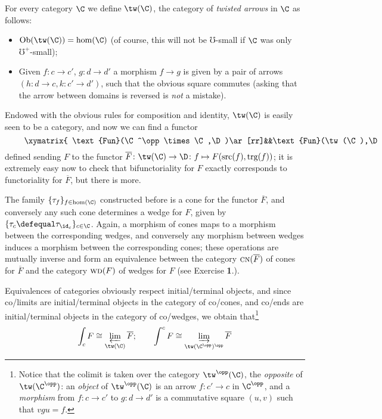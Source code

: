 \begin{definition}\label{twisted}
For every category $\C$ we define $\tw(\C)$, the category of \emph{twisted arrows} in $\C$ as follows:
\begin{itemize}
\item $\text{Ob}(\tw(\C))=\hom(\C)$ (of course, this will not be $\mho$-small if $\C$ was only $\mho^+$-small);
\item Given $f\colon c\to c'$, $g\colon d\to d'$ a morphism $f\to g$ is given by a pair of arrows $(h\colon d\to c,k\colon c'\to d')$, such that the obvious square commutes (asking that the arrow between domains is reversed is \emph{not} a mistake).
\end{itemize}
\end{definition}
Endowed with the obvious rules for composition and identity, $\tw(\C)$ is easily seen to be a category, and now we can find a functor
\[
\vcenter{\xymatrix{
\text{Fun}(\C^\opp\times\C,\D)\ar[rr]&&\text{Fun}(\tw(\C),\D)
}}
\]
defined sending $F$ to the functor $\overline F\colon \tw(\C)\to \D\colon f\mapsto F(\text{src}(f),\text{trg}(f))$; it is extremely easy now to check that bifunctoriality for $F$ exactly corresponds to functoriality for $\overline F$, but there is more.
\begin{remark}\label{is.a.colim}
The family $\{\tau_f\}_{f\in\hom(\C)}$ constructed before is a cone for the functor $\overline F$, and conversely any such cone determines a wedge for $F$, given by $\{\tau_c\defequal\tau_{\id_c}\}_{c\in \C}$. Again, a morphism of cones maps to a morphism between the corresponding wedges, and conversely any morphism between wedges induces a morphism between the corresponding cones; these operations are mutually inverse and form an equivalence between the category $\textsc{cn}(\overline F)$ of cones for $\overline F$ and the category $\textsc{wd}(F)$ of wedges for $F$ (see Exercise \textbf{1}.).
\end{remark}
Equivalences of categories obviously respect initial/terminal objects, and since co/limits are initial/terminal objects in the category of co/cones, and co/ends are initial/terminal objects in the category of co/wedges, we obtain that\footnote{Notice that the colimit is taken over the category $\tw^\opp(\C)$, the \emph{opposite} of $\tw(\C^\opp)$: an \emph{object} of $\tw^\opp(\C)$ is an arrow $f \colon c'\to c$ in $\C^\opp$, and a \emph{morphism} from $f \colon c\to c'$ to $g \colon d \to d'$ is a commutative square $(u,v)$ such that $vgu = f$.}
\[
\int_c F\cong \varprojlim_{\tw(\C)} \overline F; \qquad 
\int^c F\cong \varinjlim_{\tw(\C^\opp)^\opp} \overline F
\]
